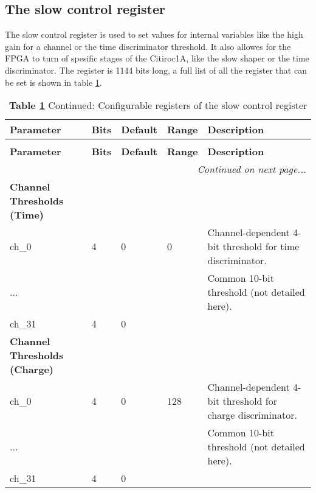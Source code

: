 \subsection{The slow control register}
The slow control register is used to set values for internal variables like the high gain for a channel or the time discriminator threshold.
It also allowes for the FPGA to turn of spesific stages of the Citiroc1A, like the slow shaper or the time discriminator.
The register is 1144 bits long, a full list of all the register that can be set is shown in table \ref{tab:slow_control_register}.
\begin{longtable}{|l|l|l|l|p{6cm}|}
    \caption{Configurable registers of the slow control register\autocite{InternalcommunicationKarl} \label{tab:slow_control_register}} \\ \hline
    \textbf{Parameter} & \textbf{Bits} & \textbf{Default} & \textbf{Range} & \textbf{Description} \\ \hline
    \endfirsthead
    \caption*{\textbf{Table \ref{tab:slow_control_register}} Continued: Configurable registers of the slow control register\autocite{InternalcommunicationKarl}} \\ \hline
    \textbf{Parameter} & \textbf{Bits} & \textbf{Default} & \textbf{Range} & \textbf{Description} \\ \hline
    \endhead
    \hline
    \multicolumn{5}{r}{\textit{Continued on next page...}} \\ \hline
    \endfoot
    \hline
    \endlastfoot
    
    \textbf{Channel Thresholds (Time)} & & & & \\ \hline
    ch\_0                & 4  & 0  & 0       & Channel-dependent 4-bit threshold for time discriminator. \\ \hline
    ...                  &    &    &         & Common 10-bit threshold (not detailed here). \\ \hline
    ch\_31               & 4  & 0  &         & \\ \hline
    
    \textbf{Channel Thresholds (Charge)} & & & & \\ \hline
    ch\_0                & 4  & 0  & 128     & Channel-dependent 4-bit threshold for charge discriminator. \\ \hline
    ...                  &    &    &         & Common 10-bit threshold (not detailed here). \\ \hline
    ch\_31               & 4  & 0  &         & \\ \hline
    

\end{longtable}
